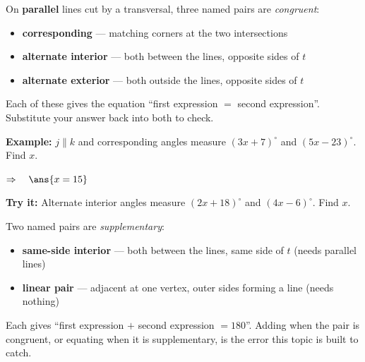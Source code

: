 \documentclass[12pt]{article}
\begin{document}


\begin{formulabox}
On \textbf{parallel} lines cut by a transversal, three named pairs are \emph{congruent}:\par
\begin{itemize}[leftmargin=1.2cm, itemsep=0pt, topsep=1pt]
  \item \textbf{corresponding} --- matching corners at the two intersections
  \item \textbf{alternate interior} --- both between the lines, opposite sides of $t$
  \item \textbf{alternate exterior} --- both outside the lines, opposite sides of $t$
\end{itemize}
Each of these gives the equation ``first expression $=$ second expression''. Substitute your answer back into both to check.
\end{formulabox}

\begin{examplebox}
\textbf{Example:} \quad $j \parallel k$ and corresponding angles measure $(3x + 7)^\circ$ and $(5x - 23)^\circ$. Find $x$.

$\Rightarrow\quad \ans{x = 15}$
\end{examplebox}

\begin{tryitbox}
\textbf{Try it:} \quad Alternate interior angles measure $(2x + 18)^\circ$ and $(4x - 6)^\circ$. Find $x$.\\[2pt]
\end{tryitbox}


\begin{formulabox}
Two named pairs are \emph{supplementary}:\par
\begin{itemize}[leftmargin=1.2cm, itemsep=0pt, topsep=1pt]
  \item \textbf{same-side interior} --- both between the lines, same side of $t$ (needs parallel lines)
  \item \textbf{linear pair} --- adjacent at one vertex, outer sides forming a line (needs nothing)
\end{itemize}
Each gives ``first expression $+$ second expression $= 180$''. Adding when the pair is congruent, or equating when it is supplementary, is the error this topic is built to catch.
\end{formulabox}
\end{document}
